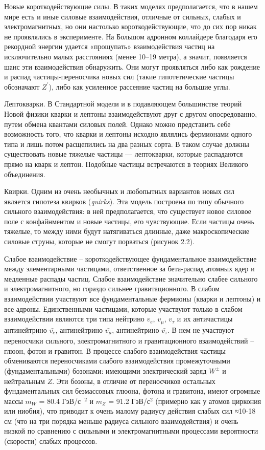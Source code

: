 Новые короткодействующие силы. В таких моделях предполагается, что в нашем мире есть и иные силовые взаимодействия, отличные от сильных, слабых и электромагнитных, но они настолько короткодействующие, что до сих пор никак не проявлялись в эксперименте. На Большом адронном коллайдере благодаря его рекордной энергии удается «прощупать» взаимодействия частиц на исключительно малых расстояниях (менее 10–19 метра), а значит, появляется шанс эти взаимодействия обнаружить. Они могут проявляться либо как рождение и распад частицы-переносчика новых сил (такие гипотетические частицы обозначают $Z^\prime$), либо как усиленное рассеяние частиц на большие углы.

Лептокварки. В Стандартной модели и в подавляющем большинстве теорий Новой физики кварки и лептоны взаимодействуют друг с другом опосредованно, путем обмена квантами силовых полей. Однако можно представить себе возможность того, что кварки и лептоны исходно являлись фермионами одного типа и лишь потом расщепились на два разных сорта. В таком случае должны существовать новые тяжелые частицы — лептокварки, которые распадаются прямо на кварк и лептон. Подобные частицы встречаются в теориях Великого объединения.

Квирки. Одним из очень необычных и любопытных вариантов новых сил является гипотеза квирков (\textit{quirks}). Эта модель построена по типу обычного сильного взаимодействия: в ней предполагается, что существует новое силовое поле с конфайнментом и новые частицы, его чувствующие. Если частицы очень тяжелые, то между ними будут натягиваться длинные, даже макроскопические силовые струны, которые не смогут порваться (рисунок 2.2).

Слабое взаимодействие – короткодействующее фундаментальное взаимодействие между элементарными частицами, ответственное за бета-распад атомных ядер и медленные распады частиц. Слабое взаимодействие значительно слабее сильного и электромагнитного, но гораздо сильнее гравитационного. В слабом взаимодействии участвуют все фундаментальные фермионы (кварки и лептоны) и все адроны. Единственными частицами, которые участвуют только в слабом взаимодействии являются три типа нейтрино $v_e$, $v_\mu$, $v_\tau$ и их античастицы  антинейтрино $\bar{v_e}$,  антинейтрино $\bar{v_\mu}$,  антинейтрино $\bar{v_\tau}$. В нем не участвуют переносчики сильного, электромагнитного и гравитационного взаимодействий -- глюон, фотон и гравитон. В процессе слабого взаимодействия частицы обмениваются переносчиками слабого взаимодействия промежуточными (фундаментальными) бозонами: имеющими электрический заряд $W^±$ и нейтральным $Z$. Эти бозоны, в отличие от переносчиков остальных фундаментальных сил безмассовых глюона, фотона и гравитона, имеют огромные массы $m_W$ = 80.4 ГэВ/с~${}^2$ и $m_Z$ = 91.2 ГэВ/с${}^2$ (примерно как у атомов циркония или ниобия), что приводит к очень малому радиусу действия слабых сил ≈10-18 см (что на три порядка меньше радиуса сильного взаимодействия) и очень низкой по сравнению с сильными и электромагнитными процессами вероятности (скорости) слабых процессов.

